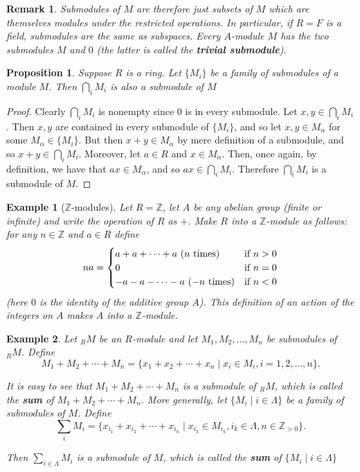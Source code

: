 \documentclass[12pt,reqno]{amsart}
\theoremstyle{plain}
\newtheorem{rem}{Remark}
\newtheorem{prop}{Proposition}
\newtheorem{ex}{Example}
\newcommand{\zz}{\mathbb Z}
\begin{document}
\begin{rem} Submodules of $M$ are therefore just subsets of $M$ which are themselves modules under the restricted operations. In particular, if $R = F$ is a field, submodules are the same as subspaces. Every $A$-module $M$ has the two submodules $M$ and $0$ (the latter is called the \textbf{trivial submodule}).
\end{rem}
\begin{prop} Suppose $R$ is a ring. Let $\{ M_i \}$ be a family of submodules of a module $M$. Then $\bigcap_i M_i$ is also a submodule of $M$
\end{prop}
\begin{proof} Clearly $\bigcap_i M_i$ is nonempty since $0$ is in every submodule. Let $x, y \in \bigcap_i M_i$. Then $x, y$ are contained in every submodule of $\{M_i \}$, and so let $x, y \in M_{\alpha}$ for some $M_{\alpha} \in \{M_i \}$. But then $x+y \in M_{\alpha}$ by mere definition of a submodule, and so $x+ y \in \bigcap_i M_i$. Moreover, let $a \in R$ and $x \in M_{\alpha}$. Then, once again, by definition, we have that $ax \in M_{\alpha}$, and so $ax \in \bigcap_i M_i$. Therefore $\bigcap_i M_i$ is a submodule of $M$. 
\end{proof}
\begin{ex}[$\zz$-modules] Let $R = \zz$, let $A$ be any abelian group (finite or infinite) and write the operation of $R$ as $+$. Make $R$ into a $\zz$-module as follows: for any $n \in \zz$ and $a \in R$ define 
\[ na = 
\begin{cases} 
a+a + \cdots + a \textup{ ($n$ times)} & \textup{if } n > 0\\
0 & \textup{if } n = 0 \\
-a-a-\cdots-a \textup{ ($-n$ times)} & \textup{if } n<0
\end{cases}
\]
(here $0$ is the identity of the additive group $A$). This definition of an action of the integers on $A$ makes $A$ into a $\zz$-module. 
\end{ex}
\begin{ex} Let $_RM$ be an $R$-module and let $M_1, M_2, \ldots, M_n$ be submodules of $_RM$.  Define \[ M_1 + M_2 + \cdots + M_n = \{x_1 + x_2 + \cdots + x_n \mid x_i \in M_i, i=1, 2, \ldots, n \} .\]

It is easy to see that $M_1 + M_2 + \cdots + M_n$ is a submodule of $_RM$, which is called the \textbf{sum} of $M_1 + M_2 + \cdots + M_n$.  More generally, let $\{M_i \mid i \in \Lambda \}$ be a family of submodules of $M$.  Define \[ \sum_i M_i =\{x_{i_1} + x_{i_2} + \cdots + x_{i_n} \mid x_{i_k} \in M_{i_k}, i_k \in \Lambda,  n \in \zz_{>0} \} .\] 

Then $\sum_{i \in \Lambda} M_i$ is a submodule of $M$, which is called the \textbf{sum} of $\{M_i \mid i \in \Lambda \}$
\end{ex}
\end{document}
